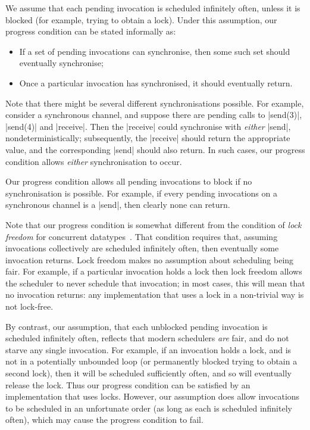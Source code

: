 We assume that each pending invocation is scheduled infinitely often, unless
it is blocked (for example, trying to obtain a lock).  Under this assumption,
our progress condition can be stated informally as:
%
\begin{itemize}
\item If a set of pending invocations can synchronise, then some such set
  should eventually synchronise;

\item Once a particular invocation has synchronised, it should eventually
  return.
\end{itemize}
%
Note that there might be several different synchronisations possible.  For
example, consider a synchronous channel, and suppose there are pending calls
to |send(3)|, |send(4)| and |receive|.  Then the |receive| could synchronise
with \emph{either} |send|, nondeterministically; subsequently, the |receive|
should return the appropriate value, and the corresponding |send| should also
return.  In such cases, our progress condition allows \emph{either}
synchronisation to occur.

Our progress condition allows all pending invocations to block if no
synchronisation is possible.  For example, if every pending invocations on a
synchronous channel is a |send|, then clearly none can return.

Note that our progress condition is somewhat different from the condition of
\emph{lock freedom} for concurrent datatypes~\cite{herlihy-shavit}.  That
condition requires that, assuming invocations collectively are scheduled
infinitely often, then eventually some invocation returns.  Lock freedom makes
no assumption about scheduling being fair.  For example, if a particular
invocation holds a lock then lock freedom allows the scheduler to never
schedule that invocation; in most cases, this will mean that no invocation
returns: any implementation that uses a lock in a non-trivial way is not
lock-free.

By contrast, our assumption, that each unblocked pending invocation is
scheduled infinitely often, reflects that modern schedulers \emph{are} fair,
and do not starve any single invocation.  For example, if an invocation holds
a lock, and is not in a potentially unbounded loop (or permanently blocked
trying to obtain a second lock), then it will be scheduled sufficiently often,
and so will eventually release the lock.  Thus our progress condition can be
satisfied by an implementation that uses locks.  However, our assumption does
allow invocations to be scheduled in an unfortunate order (as long as each is
scheduled infinitely often), which may cause the progress condition to fail.


